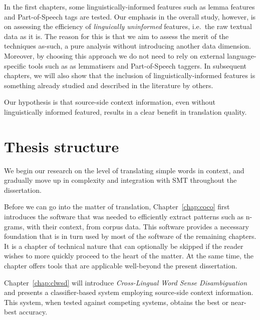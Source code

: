 In the first chapters, some linguistically-informed features such as lemma
features and Part-of-Speech tags are tested. Our emphasis in the overall study,
however, is on assessing the efficiency of \emph{linguically uninformed}
features, i.e.\ the raw textual data as it is. The reason for this is that we
aim to assess the merit of the techniques as-such, a pure analysis without
introducing another data dimension. Moreover, by choosing this approach we do
not need to rely on external language-specific tools such as as lemmatisers and
Part-of-Speech taggers. In subsequent chapters, we will also show that the
inclusion of linguistically-informed features is something already studied and
described in the literature by others. 

Our hypothesis is that source-side context information, even without
linguistically informed featured, results in a clear benefit in translation
quality. 

\section{Thesis structure}

We begin our research on the level of translating simple words in context, and
gradually move up in complexity and integration with SMT throughout the
dissertation.

Before we can go into the matter of translation, Chapter~\ref{chap:coco} first
introduces the software that was needed to efficiently extract patterns such as
n-grams, with their context, from corpus data. This software provides a
necessary foundation that is in turn used by most of the software of the
remaining chapters. It is a chapter of technical nature that can optionally be
skipped if the reader wishes to more quickly proceed to the heart of the
matter. At the same time, the chapter offers tools that are applicable
well-beyond the present dissertation.

Chapter~\ref{chap:clwsd} will introduce \emph{Cross-Lingual Word Sense
Disambiguation} and presents a classifier-based system employing source-side
context information. This system, when tested against competing systems, obtains the
best or near-best accuracy. 

